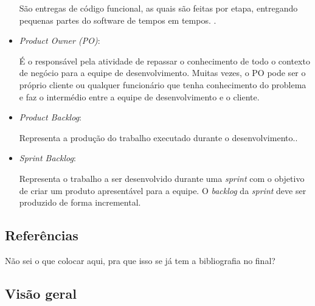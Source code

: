 \begin{itemize}
		São entregas de código funcional, as quais são feitas por etapa, entregando pequenas partes do software de tempos em tempos. \cite{beck2000extreme}.

	\item \textit{Product Owner (PO)}:

		É o responsável pela atividade de repassar o conhecimento de todo o contexto de negócio para a equipe de desenvolvimento. Muitas vezes, o PO pode ser o próprio cliente ou qualquer funcionário que tenha conhecimento do problema e faz o intermédio entre a equipe de desenvolvimento e o cliente. \cite{beck2000extreme}

	\item \textit{Product Backlog}:

		Representa a produção do trabalho executado durante o desenvolvimento.\cite{sanches2010aplicaccao}.

	\item \textit{Sprint Backlog}:

		Representa o trabalho a ser desenvolvido durante uma \textit{sprint} com o objetivo de criar um produto apresentável para a equipe. O \textit{backlog} da \textit{sprint} deve ser produzido de forma incremental.

\end{itemize}

\subsection{Referências}

Não sei o que colocar aqui, pra que isso se já tem a bibliografia no final?

\subsection{Visão geral}

